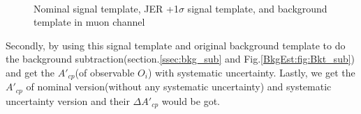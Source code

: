 		\begin{figure}[H]
		\centering
		    \\
		\caption{Nominal signal template, JER +1$\sigma$ signal template, and background template in muon channel}
		\label{Syst:fig:template}
		\end{figure}
		\FloatBarrier

		Secondly, by using this signal template and original background template to do the background subtraction(section.\ref{ssec:bkg_sub} and Fig.\ref{BkgEst:fig:Bkt_sub}) and get the $A'_{cp}$(of observable $O_i$) with systematic uncertainty. Lastly, we get the $A'_{cp}$ of nominal version(without any systematic uncertainty) and systematic uncertainty version and their $\Delta A'_{cp}$ would be got.

